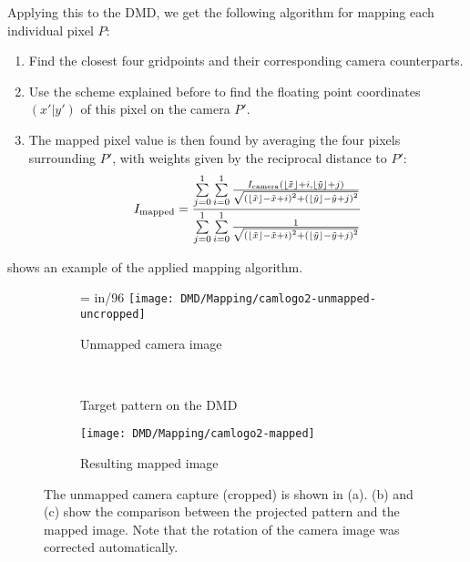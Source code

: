 \noindent
Applying this to the DMD, we get the following algorithm for mapping each individual pixel $P$:
\begin{enumerate}
    \item Find the closest four gridpoints and their corresponding camera counterparts.
    \item Use the scheme explained before to find the floating point coordinates $(x' | y')$ of this pixel on the camera $P'$.
    \item The mapped pixel value is then found by averaging the four pixels surrounding $P'$, with weights given by the reciprocal distance to $P'$: \[I_\text{mapped} = \frac{\sum\limits_{j=0}^1 \sum\limits_{i=0}^1 \frac{I_\text{camera}(\lfloor\tilde{x}\rfloor + i,\lfloor\tilde{y}\rfloor + j)}{\sqrt{\left(\lfloor\tilde{x}\rfloor - \tilde{x} + i\right)^2 + \left(\lfloor\tilde{y}\rfloor - \tilde{y} + j\right)^2}}}{\sum\limits_{j=0}^1 \sum\limits_{i=0}^1 \frac{1}{\sqrt{\left(\lfloor\tilde{x}\rfloor - \tilde{x} + i\right)^2 + \left(\lfloor\tilde{y}\rfloor - \tilde{y} + j\right)^2}}} \] 
\end{enumerate}
 shows an example of the applied mapping algorithm.

\vspace*{7mm}
\begin{figure}[hbp]
    \centering
    \begin{subfigure}[c]{0.45\textwidth}
        \pdfpxdimen= in/96\relax
        \texttt{[image: DMD/Mapping/camlogo2-unmapped-uncropped]}
        \caption{Unmapped camera image}
    \end{subfigure}\\[\baselineskip]
    \begin{subfigure}[c]{0.49\textwidth}
        \centering
        \caption{Target pattern on the DMD}
        \label{fig:mapping_example_target}
    \end{subfigure}
    \begin{subfigure}[c]{0.49\textwidth}
        \centering
        \texttt{[image: DMD/Mapping/camlogo2-mapped]}
        \caption{Resulting mapped image}
        \label{fig:mapping_example_mapped}
    \end{subfigure}
    \caption[Example images for the camera-to-DMD mapping]{The unmapped camera capture (cropped) is shown in (a). (b) and (c) show the comparison between the projected pattern and the mapped image. Note that the rotation of the camera image was corrected automatically.}
    \label{fig:mapping_example}
\end{figure}

